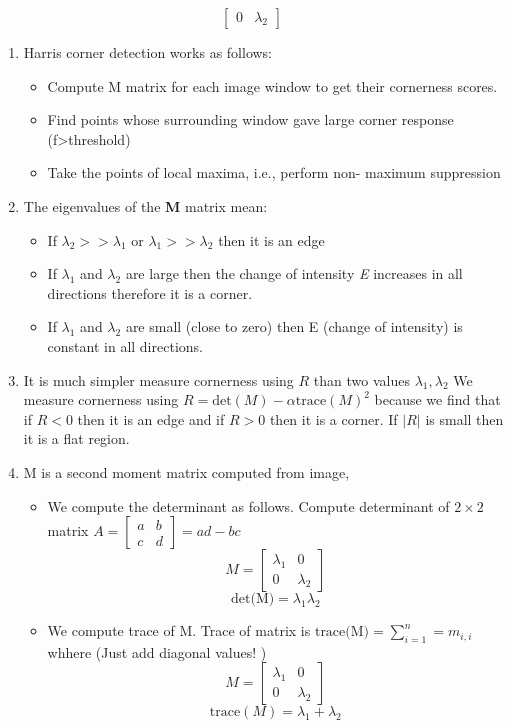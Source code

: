 \documentclass[12pt,letterpaper]{article}
\begin{document}
\begin{enumerate}
$$\begin{bmatrix}
    0 & \lambda_2
    \end{bmatrix}$$
    \begin{enumerate}
        \item Harris corner detection works as follows: 
        \begin{itemize}
            \item  Compute M matrix for each image window to get
their cornerness scores.
            \item Find points whose surrounding window gave large
corner response (f>threshold)
            \item Take the points of local maxima, i.e., perform non-
maximum suppression
        \end{itemize}
        \item The eigenvalues of the \textbf{M} matrix mean: 
        \begin{itemize}
            \item  If $\lambda_2 >> \lambda_1$ or  $\lambda_1 >> \lambda_2$  then it is an edge
            \item If $\lambda_1$ and $\lambda_2$ are large then the change of intensity \textit{E} increases in all directions therefore it is a corner. 
            \item If $\lambda_1$ and $\lambda_2$ are small (close to zero) then E (change of intensity) is constant in all directions. 
        \end{itemize}
        \item It is much simpler measure cornerness using $R$ than two values $\lambda_1, \lambda_2$ We measure cornerness using $R = \text{det}(M) - \alpha \text{trace}(M)^2$ because we find that if $R < 0$ then it is an edge and if $R > 0$ then it is a corner. If $|R|$ is small then it is a flat region. 
        \item M is a second moment matrix computed from image, 
        \begin{itemize}
            \item We compute the determinant as follows. Compute determinant of $2\times 2$ matrix $A =\begin{bmatrix}a & b \\ c & d\end{bmatrix} = ad - bc$
              $$M = \begin{bmatrix}
    \lambda_1 & 0 \\
    0 & \lambda_2
    \end{bmatrix} $$
            $$\text{det(M)} = \lambda_1\lambda_2$$
            \item We compute trace of M. Trace of matrix is $\text{trace(M)} = \sum_{i = 1}^{n} = m_{i,i}$ whhere (Just add diagonal values! \dSmiley)
      $$M = \begin{bmatrix}
    \lambda_1 & 0 \\
    0 & \lambda_2
    \end{bmatrix} $$
            $$\text{trace}{(M)} = \lambda_1 + \lambda_2$$
        \end{itemize}


\end{enumerate}
\end{enumerate}
\end{document}
